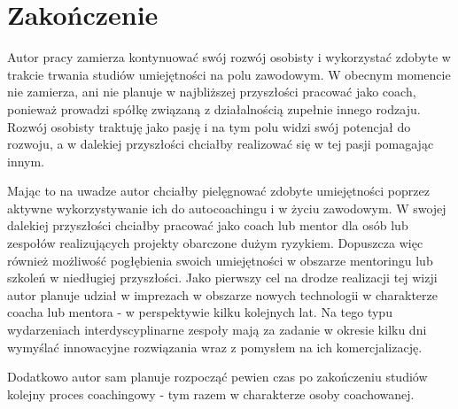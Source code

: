 \chapter{Zakończenie}


Autor pracy zamierza kontynuować swój rozwój osobisty i wykorzystać zdobyte w trakcie trwania studiów umiejętności na polu zawodowym.
W obecnym momencie nie zamierza, ani nie planuje w najbliższej przyszłości pracować jako coach, ponieważ prowadzi spółkę związaną z działalnością
zupełnie innego rodzaju. Rozwój osobisty traktuję jako pasję i na tym polu widzi swój potencjał do rozwoju, a w dalekiej przyszłości
chciałby realizować się w tej pasji pomagając innym.

Mając to na uwadze autor chciałby pielęgnować zdobyte umiejętności poprzez aktywne wykorzystywanie ich do autocoachingu i w życiu zawodowym.
W swojej dalekiej przyszłości chciałby pracować jako coach lub mentor dla osób lub zespołów realizujących projekty obarczone dużym ryzykiem.
Dopuszcza więc również możliwość pogłębienia swoich umiejętności w obszarze mentoringu lub szkoleń w niedługiej przyszłości.
Jako pierwszy cel na drodze realizacji tej wizji autor planuje udział w imprezach w obszarze nowych technologii
w charakterze coacha lub mentora - w perspektywie kilku kolejnych lat. Na tego typu wydarzeniach interdyscyplinarne zespoły mają za zadanie
w okresie kilku dni wymyślać innowacyjne rozwiązania wraz z pomysłem na ich komercjalizację.

Dodatkowo autor sam planuje rozpocząć pewien czas po zakończeniu studiów kolejny proces coachingowy - tym razem w charakterze osoby coachowanej.
